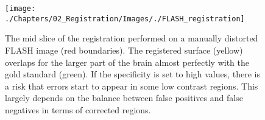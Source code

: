\begin{figure}[!ht]
\centering
\texttt{[image: ./Chapters/02\_Registration/Images/./FLASH\_registration]}
\caption{The mid slice of the registration performed on a manually distorted FLASH image (red boundaries). The registered surface (yellow) overlaps for the larger part of the brain almost perfectly with the gold standard (green). If the specificity is set to high values, there is a risk that errors start to appear in some low contrast regions. This largely depends on the balance between false positives and false negatives in terms of corrected regions.}
\label{fig:flashregistration}
\end{figure}